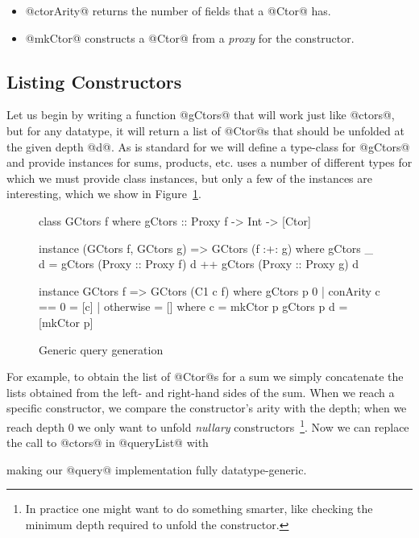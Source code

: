 \begin{itemize}
\item{@ctorArity@} returns the number of fields that a @Ctor@ has.
\item{@mkCtor@} constructs a @Ctor@ from a \emph{proxy} for the constructor.
\end{itemize}

\subsection{Listing Constructors}\label{sec:generic-constructors}
Let us begin by writing a function @gCtors@ that will work just like @ctors@,
but for any datatype, \ie it will return a list of @Ctor@s that should be
unfolded at the given depth @d@. As is standard for \GhcGenerics we will define
a type-class for @gCtors@ and provide instances for sums, products, etc.
\GhcGenerics uses a number of different types for which we must provide class
instances, but only a few of the instances are interesting, which we show in
Figure~\ref{fig:generic-query}.
%
\begin{figure}[ht]
\begin{mdframed}
\begin{CenteredBox}
\begin{code}
  class GCtors f where
    gCtors :: Proxy f -> Int -> [Ctor]

  instance (GCtors f, GCtors g) => GCtors (f :+: g) where
    gCtors _ d = gCtors (Proxy :: Proxy f) d 
              ++ gCtors (Proxy :: Proxy g) d

  instance GCtors f => GCtors (C1 c f) where
    gCtors p 0
      | conArity c == 0 = [c]
      | otherwise       = []
      where
        c = mkCtor p
    gCtors p d
      = [mkCtor p]
\end{code}
\end{CenteredBox}
\end{mdframed}
\caption{Generic query generation}\label{fig:generic-query}
\end{figure}
%
For example, to obtain the list of @Ctor@s for a sum we simply concatenate the
lists obtained from the left- and right-hand sides of the sum.  When we reach a
specific constructor, we compare the constructor's arity with the depth; when we
reach depth 0 we only want to unfold \emph{nullary} constructors~\footnote{In
  practice one might want to do something smarter, like checking the minimum
  depth required to unfold the constructor.}.
Now we can replace the call to @ctors@ in @queryList@ with
%
%
making our @query@ implementation fully datatype-generic.

